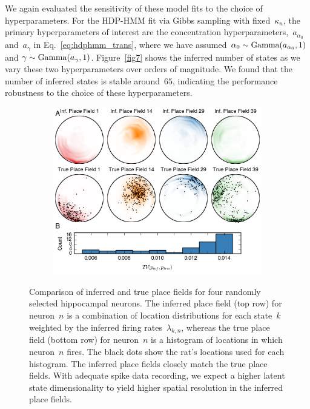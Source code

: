 We again evaluated the sensitivity of these model fits to the choice
of hyperparameters. For the HDP-HMM fit via Gibbs sampling with
fixed~$\kappa_n$, the primary hyperparameters of interest are the
concentration hyperparameters,~$a_{\alpha_0}$ and~$a_{\gamma}$ in
Eq.~\ref{eq:hdphmm_trans}, where we have assumed $ \alpha_0 \sim
\mathrm{Gamma}(a_{\alpha_0}, 1)$ and $ \gamma \sim \mathrm{Gamma}(a_\gamma, 1)
$.  Figure~\ref{fig7} shows the inferred number of states as we vary
these two hyperparameters over orders of magnitude. We found that the
number of inferred states is stable around~$65$, indicating the
performance robustness to the choice of these hyperparameters.

\begin{figure}[t!]
  \centering
  \begin{subfigure}[t]{5in}
    \includegraphics[width=\textwidth]{figures/ch7/Fig8}
  \end{subfigure}
  \caption[True and inferred place field comparison]{Comparison of
    inferred and true place fields for four randomly selected
    hippocampal neurons. The inferred place field (top row) for
    neuron~$n$ is a combination of location distributions for each
    state~$k$ weighted by the inferred firing rates~$\lambda_{k,n}$,
    whereas the true place field (bottom row) for neuron~$n$ is a
    histogram of locations in which neuron~$n$ fires. The black dots
    show the rat's locations used for each histogram. The inferred
    place fields closely match the true place fields. With adequate
    spike data recording, we expect a higher latent state
    dimensionality to yield higher spatial resolution in the inferred
    place fields.}
  \label{fig8}
\end{figure}

